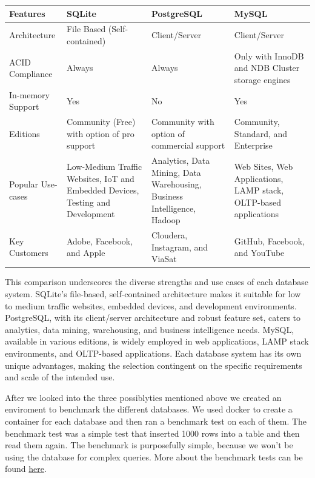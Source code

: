 \begin{center}
    \begin{tabular}{ | m{3cm} | m{4cm}| m{4cm} | m{4cm} | } 
      \hline
      Features & SQLite & PostgreSQL & MySQL \\ 
      \hline
      Architecture & File Based (Self-contained) & Client/Server & Client/Server \\ 
      \hline
      ACID Compliance & Always & Always & Only with InnoDB and NDB Cluster storage engines \\ 
      \hline
      In-memory Support & Yes & No & Yes \\
      \hline
      Editions & Community (Free) with option of pro support & Community with option of commercial support & Community, Standard, and Enterprise \\
      \hline
      Popular Use-cases & Low-Medium Traffic Websites, IoT and Embedded Devices, Testing and Development & Analytics, Data Mining, Data Warehousing, Business Intelligence, Hadoop & Web Sites, Web Applications, LAMP stack, OLTP-based applications \\
      \hline
      Key Customers & Adobe, Facebook, and Apple & Cloudera, Instagram, and ViaSat & GitHub, Facebook, and YouTube \\
      \hline
    \end{tabular}
\end{center}

This comparison underscores the diverse strengths and use cases of each database system. SQLite's file-based, self-contained architecture makes it suitable for 
low to medium traffic websites, embedded devices, and development environments. PostgreSQL, with its client/server architecture and robust feature set, caters 
to analytics, data mining, warehousing, and business intelligence needs. MySQL, available in various editions, is widely employed in web applications, LAMP 
stack environments, and OLTP-based applications. Each database system has its own unique advantages, making the selection contingent on the specific 
requirements and scale of the intended use.\newline

After we looked into the three possiblyties mentioned above we created an enviroment to benchmark the different databases. We used docker to create a container for each 
database and then ran a benchmark test on each of them. The benchmark test was a simple test that inserted 1000 rows into a table and then read them again. The benchmark is
purposefully simple, because we won't be using the database for complex queries. More about the benchmark tests can be found \href{tests.tex}{here}.

